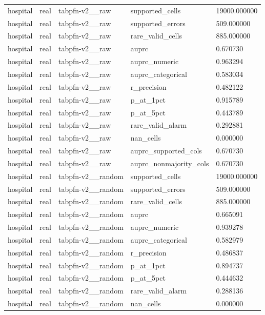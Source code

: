 \begin{tabular}{lllll}
hospital & real & tabpfn-v2\_\_raw & supported\_cells & 19000.000000 \\
hospital & real & tabpfn-v2\_\_raw & supported\_errors & 509.000000 \\
hospital & real & tabpfn-v2\_\_raw & rare\_valid\_cells & 885.000000 \\
hospital & real & tabpfn-v2\_\_raw & auprc & 0.670730 \\
hospital & real & tabpfn-v2\_\_raw & auprc\_numeric & 0.963294 \\
hospital & real & tabpfn-v2\_\_raw & auprc\_categorical & 0.583034 \\
hospital & real & tabpfn-v2\_\_raw & r\_precision & 0.482122 \\
hospital & real & tabpfn-v2\_\_raw & p\_at\_1pct & 0.915789 \\
hospital & real & tabpfn-v2\_\_raw & p\_at\_5pct & 0.443789 \\
hospital & real & tabpfn-v2\_\_raw & rare\_valid\_alarm & 0.292881 \\
hospital & real & tabpfn-v2\_\_raw & nan\_cells & 0.000000 \\
hospital & real & tabpfn-v2\_\_raw & auprc\_supported\_cols & 0.670730 \\
hospital & real & tabpfn-v2\_\_raw & auprc\_nonmajority\_cols & 0.670730 \\
hospital & real & tabpfn-v2\_\_random & supported\_cells & 19000.000000 \\
hospital & real & tabpfn-v2\_\_random & supported\_errors & 509.000000 \\
hospital & real & tabpfn-v2\_\_random & rare\_valid\_cells & 885.000000 \\
hospital & real & tabpfn-v2\_\_random & auprc & 0.665091 \\
hospital & real & tabpfn-v2\_\_random & auprc\_numeric & 0.939278 \\
hospital & real & tabpfn-v2\_\_random & auprc\_categorical & 0.582979 \\
hospital & real & tabpfn-v2\_\_random & r\_precision & 0.486837 \\
hospital & real & tabpfn-v2\_\_random & p\_at\_1pct & 0.894737 \\
hospital & real & tabpfn-v2\_\_random & p\_at\_5pct & 0.444632 \\
hospital & real & tabpfn-v2\_\_random & rare\_valid\_alarm & 0.288136 \\
hospital & real & tabpfn-v2\_\_random & nan\_cells & 0.000000 \\

\end{tabular}
